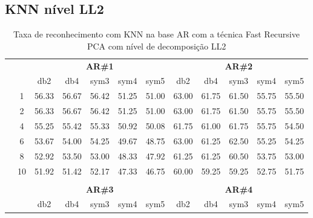 \subsection{KNN nível LL2}

\begin{table}[H]
	\centering
    \normalsize
	\caption{Taxa de reconhecimento com KNN na base AR com a técnica Fast Recursive PCA com nível de decomposição LL2}
	\begin{tabular}{|c|c|c c c c c|c c c c c|}
\cline{3-12}
\multicolumn{2}{c|}{\multirow{2}{*}{}} & \multicolumn{5}{c|}{\textbf{AR\#1}}  & \multicolumn{5}{c|}{\textbf{AR\#2}} \\\cline{3-12}

\multicolumn{2}{c|}{}  & db2 & db4 & sym3 & sym4 & sym5 & db2 & db4& sym3 & sym4 & sym5 \\\hline

\multicolumn{1}{|c|}{ \multirow{5}{*}{\rotatebox[origin=c]{90}{\textbf{K-vizinhos}}} }
&1	&56.33&	56.67&	56.42&	51.25&	51.00&	63.00&	61.75&	61.50&	55.75&	55.50\\\cline{2-12}
&2	&56.33&	56.67&	56.42&	51.25&	51.00&	63.00&	61.75&	61.50&	55.75&	55.50\\\cline{2-12}
&4	&55.25&	55.42&	55.33&	50.92&	50.08&	61.75&	61.00&	61.75&	55.75&	54.50\\\cline{2-12}
&6	&53.67&	54.00&	54.25&	49.67&	48.75&	63.00&	61.25&	62.50&	55.25&	54.25\\\cline{2-12}
&8	&52.92&	53.50&	53.00&	48.33&	47.92&	61.25&	61.25&	60.50&	53.75&	53.00\\\cline{2-12}
&10	&51.92&	51.42&	52.17&	47.33&	46.75&	60.00&	59.25&	59.25&	52.75&	51.75%


\\ \midrule
\multicolumn{12}{c}{}\\ 




\cline{3-12}
\multicolumn{2}{c}{} & \multicolumn{5}{|c|}{\textbf{AR\#3}}  & \multicolumn{5}{c|}{\textbf{AR\#4}} \\\cline{3-12}
\multicolumn{2}{c}{}  & \multicolumn{1}{|c}{db2} & db4 & sym3 & sym4 & sym5 & db2 & db4& sym3 & sym4 & sym5 \\\hline


\end{tabular}
\end{table}
